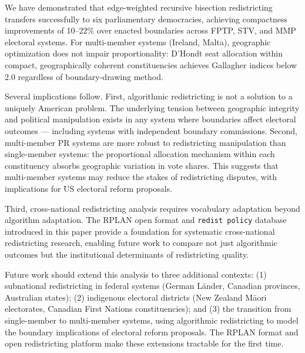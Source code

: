 
We have demonstrated that edge-weighted recursive bisection redistricting transfers successfully to six parliamentary democracies, achieving compactness improvements of 10--22\% over enacted boundaries across FPTP, STV, and MMP electoral systems. For multi-member systems (Ireland, Malta), geographic optimization does not impair proportionality: D'Hondt seat allocation within compact, geographically coherent constituencies achieves Gallagher indices below 2.0 regardless of boundary-drawing method.

Several implications follow. First, algorithmic redistricting is not a solution to a uniquely American problem. The underlying tension between geographic integrity and political manipulation exists in any system where boundaries affect electoral outcomes --- including systems with independent boundary commissions. Second, multi-member PR systems are more robust to redistricting manipulation than single-member systems: the proportional allocation mechanism within each constituency absorbs geographic variation in vote shares. This suggests that multi-member systems may reduce the stakes of redistricting disputes, with implications for US electoral reform proposals.

Third, cross-national redistricting analysis requires vocabulary adaptation beyond algorithm adaptation. The RPLAN open format and \texttt{redist policy} database introduced in this paper provide a foundation for systematic cross-national redistricting research, enabling future work to compare not just algorithmic outcomes but the institutional determinants of redistricting quality.

Future work should extend this analysis to three additional contexts: (1) subnational redistricting in federal systems (German Länder, Canadian provinces, Australian states); (2) indigenous electoral districts (New Zealand Māori electorates, Canadian First Nations constituencies); and (3) the transition from single-member to multi-member systems, using algorithmic redistricting to model the boundary implications of electoral reform proposals. The RPLAN format and open redistricting platform make these extensions tractable for the first time.
